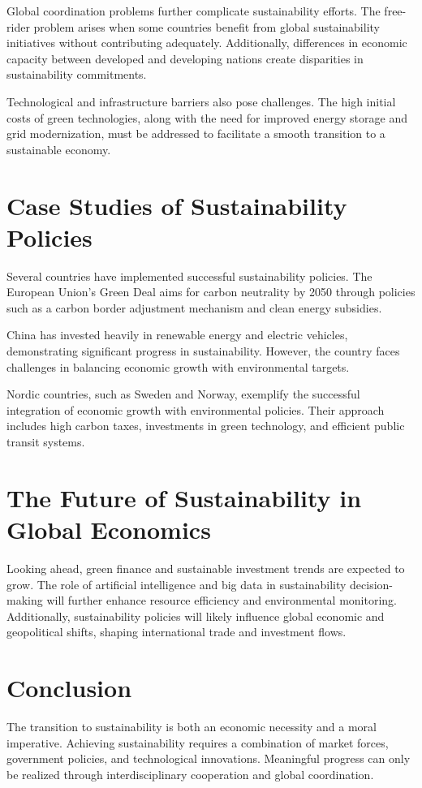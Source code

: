 \documentclass[12pt]{article}
\begin{document}
Global coordination problems further complicate sustainability efforts. The free-rider problem arises when some countries benefit from global sustainability initiatives without contributing adequately. Additionally, differences in economic capacity between developed and developing nations create disparities in sustainability commitments.

Technological and infrastructure barriers also pose challenges. The high initial costs of green technologies, along with the need for improved energy storage and grid modernization, must be addressed to facilitate a smooth transition to a sustainable economy.

\section{Case Studies of Sustainability Policies}
Several countries have implemented successful sustainability policies. The European Union’s Green Deal aims for carbon neutrality by 2050 through policies such as a carbon border adjustment mechanism and clean energy subsidies. 

China has invested heavily in renewable energy and electric vehicles, demonstrating significant progress in sustainability. However, the country faces challenges in balancing economic growth with environmental targets.

Nordic countries, such as Sweden and Norway, exemplify the successful integration of economic growth with environmental policies. Their approach includes high carbon taxes, investments in green technology, and efficient public transit systems.

\section{The Future of Sustainability in Global Economics}
Looking ahead, green finance and sustainable investment trends are expected to grow. The role of artificial intelligence and big data in sustainability decision-making will further enhance resource efficiency and environmental monitoring. Additionally, sustainability policies will likely influence global economic and geopolitical shifts, shaping international trade and investment flows.

\section{Conclusion}
The transition to sustainability is both an economic necessity and a moral imperative. Achieving sustainability requires a combination of market forces, government policies, and technological innovations. Meaningful progress can only be realized through interdisciplinary cooperation and global coordination.
\end{document}
